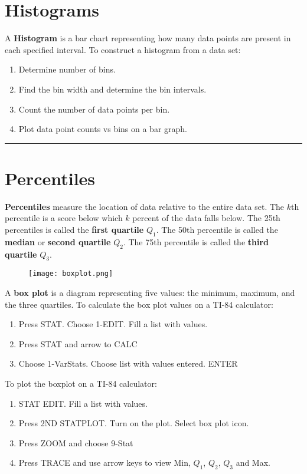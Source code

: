 \documentclass{article}
\theoremstyle{definition}
\newcommand{\secend}[0]{\noindent\rule[0.5ex]{\linewidth}{1pt}}
\begin{document}
\section*{Histograms}
\begin{definition}
    A \textbf{Histogram} is a bar chart representing how many data points are
    present in each specified interval.
    \tcblower
    \noindent To construct a histogram from a data set:
    \begin{enumerate}
        \item Determine number of bins.
        \item Find the bin width and determine the bin intervals.
        \item Count the number of data points per bin.
        \item Plot data point counts vs bins on a bar graph.
    \end{enumerate}
\end{definition}
\secend

\section*{Percentiles}
\begin{definition}
    \textbf{Percentiles} measure the location of data relative to the entire
    data set. The $k$th percentile is a score below which $k$ percent of the
    data falls below.
    \tcblower
    The 25th percentiles is called the \textbf{first quartile} $Q_1$. The 50th
    percentile is called the \textbf{median} or \textbf{second quartile} $Q_2$.
    The 75th percentile is called the \textbf{third quartile} $Q_3$.
\end{definition}

\begin{figure}[h]
    \centering
    \texttt{[image: boxplot.png]}
\end{figure}

\begin{definition}
    A \textbf{box plot} is a diagram representing five values: the minimum,
    maximum, and the three quartiles.
    \tcblower
    To calculate the box plot values on a TI-84 calculator:
    \begin{enumerate}
        \item Press STAT. Choose 1-EDIT. Fill a list with values. 
        \item Press STAT and arrow to CALC
        \item Choose 1-VarStats. Choose list with values entered. ENTER 
    \end{enumerate}
    To plot the boxplot on a TI-84 calculator:
    \begin{enumerate}
        \item STAT EDIT. Fill a list with values.
        \item Press 2ND STATPLOT. Turn on the plot. Select box plot icon.
        \item Press ZOOM and choose 9-Stat
        \item Press TRACE and use arrow keys to view Min, $Q_1$, $Q_2$, $Q_3$
            and Max.
    \end{enumerate}
\end{definition}
\end{document}
